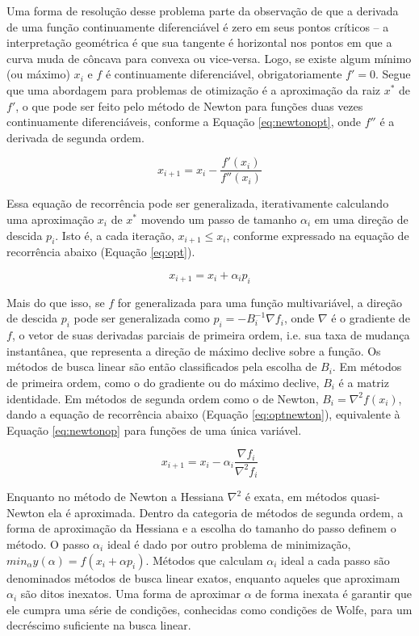 \documentclass[cic,tc]{iiufrgs}
\begin{document}
Uma forma de resolução desse problema parte da observação de que a derivada de
uma função continuamente diferenciável é zero em seus pontos críticos -- a
interpretação geométrica é que sua tangente é horizontal nos pontos em que a
curva muda de côncava para convexa ou vice-versa. Logo, se existe algum mínimo
(ou máximo) $x_i$ e $f$ é continuamente diferenciável, obrigatoriamente $f' =
0$. Segue que uma abordagem para problemas de otimização é a aproximação da
raiz $x^*$ de $f'$, o que pode ser feito pelo método de Newton para funções
duas vezes continuamente diferenciáveis, conforme a Equação \ref{eq:newtonopt},
onde $f''$ é a derivada de segunda ordem.

\begin{equation}
\label{eq:newtonopt}
x_{i + 1} = x_i - \frac{f'(x_i)}{f''(x_i)}
\end{equation}

Essa equação de recorrência pode ser generalizada, iterativamente calculando
uma aproximação $x_i$ de $x^*$ movendo um passo de tamanho $\alpha_i$ em uma
direção de descida $p_i$. Isto é, a cada iteração, $x_{i+1} \le x_i$, conforme
expressado na equação de recorrência abaixo (Equação \ref{eq:opt}).

\begin{equation}
\label{eq:opt}
x_{i + 1} = x_i + \alpha_i p_i
\end{equation}

Mais do que isso, se $f$ for generalizada para uma função multivariável, a
direção de descida $p_i$ pode ser generalizada como $p_i = -B_{i}^{-1} \nabla
f_i$, onde $\nabla$ é o gradiente de $f$, o vetor de suas derivadas parciais de
primeira ordem, i.e. sua taxa de mudança instantânea, que representa a direção
de máximo declive sobre a função. Os métodos de busca linear são então
classificados pela escolha de $B_i$. Em métodos de primeira ordem, como o do
gradiente ou do máximo declive, $B_i$ é a matriz identidade. Em métodos de
segunda ordem como o de Newton, $B_i = \nabla^2 f(x_i)$, dando a equação de
recorrência abaixo (Equação \ref{eq:optnewton}), equivalente à Equação
\ref{eq:newtonop} para funções de uma única variável.

\begin{equation}
\label{eq:optnewton}
x_{i + 1} = x_i - \alpha_i \frac{\nabla f_i}{\nabla^2 f_i}
\end{equation}

Enquanto no método de Newton a Hessiana $\nabla^2$ é exata, em métodos
quasi-Newton ela é aproximada. Dentro da categoria de métodos de segunda ordem,
a forma de aproximação da Hessiana e a escolha do tamanho do passo definem o
método. O passo $\alpha_i$ ideal é dado por outro problema de minimização,
$min_\alpha y(\alpha) = f(x_i + \alpha p_i)$. Métodos que calculam $\alpha_i$
ideal a cada passo são denominados métodos de busca linear exatos, enquanto
aqueles que aproximam $\alpha_i$ são ditos inexatos. Uma forma de aproximar
$\alpha$ de forma inexata é garantir que ele cumpra uma série de condições,
conhecidas como condições de Wolfe, para um decréscimo suficiente na busca
linear.
\end{document}
